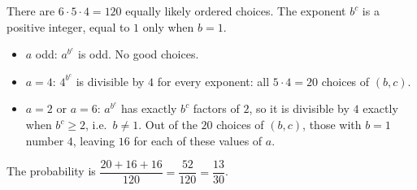 There are $6\cdot5\cdot4=120$ equally likely ordered choices. The exponent $b^c$ is a positive integer, equal to $1$ only when $b=1$.
\begin{itemize}
\item $a$ odd: $a^{b^c}$ is odd. No good choices.
\item $a=4$: $4^{b^c}$ is divisible by $4$ for every exponent: all $5\cdot4=20$ choices of $(b,c)$.
\item $a=2$ or $a=6$: $a^{b^c}$ has exactly $b^c$ factors of $2$, so it is divisible by $4$ exactly when $b^c\ge2$, i.e.\ $b\ne1$. Out of the $20$ choices of $(b,c)$, those with $b=1$ number $4$, leaving $16$ for each of these values of $a$.
\end{itemize}
The probability is $\dfrac{20+16+16}{120}=\dfrac{52}{120}=\boxed{\dfrac{13}{30}}$.
